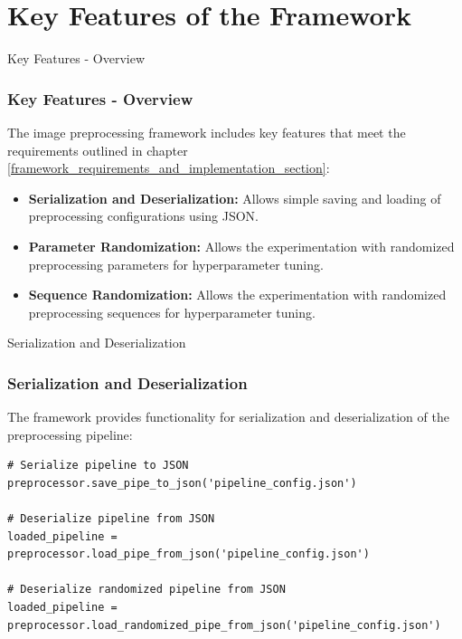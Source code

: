 \section{Key Features of the Framework}
\label{key_features_section}


\begin{frame}{Key Features - Overview}
    \frametitle{Key Features - Overview}
    The image preprocessing framework includes key features that meet the requirements outlined in chapter \ref{framework_requirements_and_implementation_section}:
    \begin{itemize}
        \item \textbf{Serialization and Deserialization:}  Allows simple saving and loading of preprocessing configurations using JSON.
        \item \textbf{Parameter Randomization:}  Allows the experimentation with randomized preprocessing parameters for hyperparameter tuning.
        \item \textbf{Sequence Randomization:} Allows the experimentation with randomized preprocessing sequences for hyperparameter tuning.
    \end{itemize}
\end{frame}

\begin{frame}[fragile]{Serialization and Deserialization}
    \frametitle{Serialization and Deserialization}
    The framework provides functionality for serialization and deserialization of the preprocessing pipeline:

    \begin{lstlisting}[caption={Serialization and Deserialization Example.}, label=lst:serialization]
# Serialize pipeline to JSON
preprocessor.save_pipe_to_json('pipeline_config.json')

# Deserialize pipeline from JSON
loaded_pipeline = preprocessor.load_pipe_from_json('pipeline_config.json')

# Deserialize randomized pipeline from JSON
loaded_pipeline = preprocessor.load_randomized_pipe_from_json('pipeline_config.json')
    \end{lstlisting}
\end{frame}

